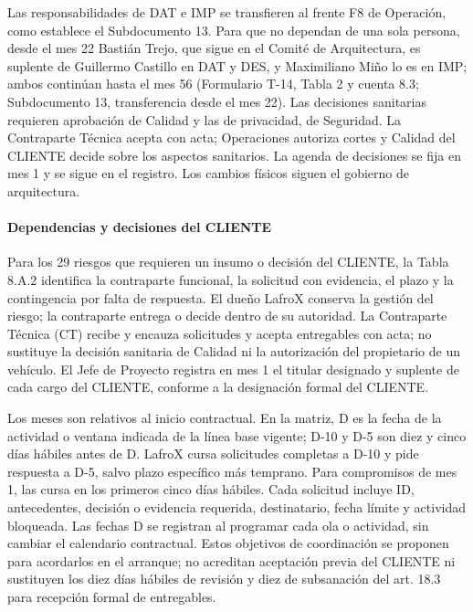 Las responsabilidades de DAT e IMP se transfieren al frente F8 de Operación, como establece el Subdocumento 13. Para que no dependan de una sola persona, desde el mes 22 Bastián Trejo, que sigue en el Comité de Arquitectura, es suplente de Guillermo Castillo en DAT y DES, y Maximiliano Miño lo es en IMP; ambos continúan hasta el mes 56 (Formulario T-14, Tabla 2 y cuenta 8.3; Subdocumento 13, transferencia desde el mes 22). Las decisiones sanitarias requieren aprobación de Calidad y las de privacidad, de Seguridad. La Contraparte Técnica acepta con acta; Operaciones autoriza cortes y Calidad del CLIENTE decide sobre los aspectos sanitarios. La agenda de decisiones se fija en mes 1 y se sigue en el registro. Los cambios físicos siguen el gobierno de arquitectura.

\paragraph{Dependencias y decisiones del CLIENTE}
Para los 29 riesgos que requieren un insumo o decisión del CLIENTE, la Tabla 8.A.2 identifica la contraparte funcional, la solicitud con evidencia, el plazo y la contingencia por falta de respuesta. El dueño LafroX conserva la gestión del riesgo; la contraparte entrega o decide dentro de su autoridad. La Contraparte Técnica (CT) recibe y encauza solicitudes y acepta entregables con acta; no sustituye la decisión sanitaria de Calidad ni la autorización del propietario de un vehículo. El Jefe de Proyecto registra en mes 1 el titular designado y suplente de cada cargo del CLIENTE, conforme a la designación formal del CLIENTE.

Los meses son relativos al inicio contractual. En la matriz, D es la fecha de la actividad o ventana indicada de la línea base vigente; D-10 y D-5 son diez y cinco días hábiles antes de D. LafroX cursa solicitudes completas a D-10 y pide respuesta a D-5, salvo plazo específico más temprano. Para compromisos de mes 1, las cursa en los primeros cinco días hábiles. Cada solicitud incluye ID, antecedentes, decisión o evidencia requerida, destinatario, fecha límite y actividad bloqueada. Las fechas D se registran al programar cada ola o actividad, sin cambiar el calendario contractual. Estos objetivos de coordinación se proponen para acordarlos en el arranque; no acreditan aceptación previa del CLIENTE ni sustituyen los diez días hábiles de revisión y diez de subsanación del art. 18.3 para recepción formal de entregables.

